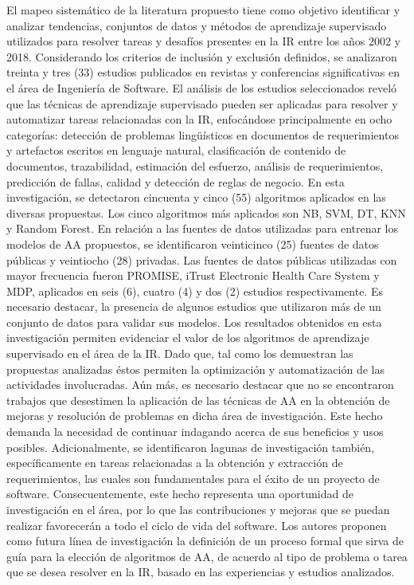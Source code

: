 \documentclass[journal]{IEEEtran}
\begin{document}
El mapeo sistemático de la literatura propuesto tiene como objetivo identificar y analizar tendencias, conjuntos de datos y métodos de aprendizaje supervisado utilizados para resolver tareas y desafíos presentes en la IR entre los años 2002 y 2018. 
Considerando los criterios de inclusión y exclusión definidos, se analizaron treinta y tres (33) estudios publicados en revistas y conferencias significativas en el área de Ingeniería de Software. El análisis de los estudios seleccionados reveló que las técnicas de aprendizaje supervisado pueden ser aplicadas para resolver y automatizar tareas relacionadas con la IR, enfocándose principalmente en ocho categorías: detección de problemas lingüísticos en documentos de requerimientos y artefactos escritos en lenguaje natural, clasificación de contenido de documentos, trazabilidad, estimación del esfuerzo, análisis de requerimientos, predicción de fallas, calidad y detección de reglas de negocio.
En esta investigación, se detectaron cincuenta y cinco (55) algoritmos aplicados en las diversas propuestas. Los cinco algoritmos más aplicados son NB, SVM, DT, KNN y Random Forest.
En relación a las fuentes de datos utilizadas para entrenar los modelos de AA propuestos, se identificaron veinticinco (25) fuentes de datos públicas y veintiocho (28) privadas. Las fuentes de datos públicas utilizadas con mayor frecuencia fueron PROMISE, iTrust Electronic Health Care System y MDP,  aplicados en seis (6), cuatro (4) y dos (2) estudios respectivamente. Es necesario destacar, la presencia de algunos estudios que utilizaron más de un conjunto de datos para validar sus modelos.  
Los resultados obtenidos en esta investigación permiten evidenciar el valor de los algoritmos de aprendizaje supervisado en el área de la IR. Dado que, tal como los demuestran las propuestas analizadas éstos permiten la optimización y automatización de las actividades involucradas. Aún más, es necesario destacar que no se encontraron trabajos que desestimen la aplicación de las técnicas de AA en la obtención de mejoras y resolución de problemas en dicha área de investigación. Este hecho demanda la necesidad de continuar indagando acerca de sus beneficios y usos posibles.
Adicionalmente, se identificaron lagunas de investigación también, específicamente en tareas relacionadas a la obtención y extracción de requerimientos, las cuales son fundamentales para el éxito de un proyecto de software. Consecuentemente, este hecho representa una oportunidad de investigación en el área, por lo que  las contribuciones y mejoras que se puedan realizar favorecerán a todo el ciclo de vida del software.  
Los autores proponen como futura línea de investigación la definición de un proceso formal que sirva de guía para la elección de algoritmos de AA, de acuerdo al tipo de problema o tarea que se desea resolver en la IR, basado en las experiencias y estudios analizados.  
\end{document}
